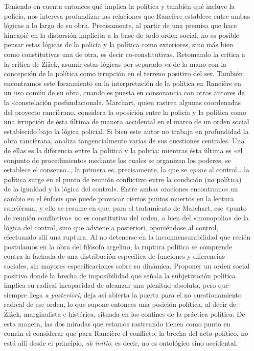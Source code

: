 Teniendo en cuenta entonces qué implica la política y también qué incluye la policía, nos interesa profundizar las relaciones que Rancière establece entre ambas lógicas a lo largo de su obra. Precisamente, al partir de una premisa que hace hincapié en la distorsión implícita a la base de todo orden social, no es posible pensar estas lógicas de la policía y la política como exteriores, sino más bien como constitutivas una de otra, es decir co-constitutivas. Retomando la crítica a la crítica de Žižek, asumir estas lógicas por separado va de la mano con la concepción de la política como irrupción en el terreno positivo del ser. También encontramos este forzamiento en la interpretación de la política en Rancière en un uso común de su obra, cuando es puesta en consonancia con otros autores de la «constelación posfundacional». Marchart, quien rastrea algunas coordenadas del proyecto rancièrano, considera la oposición entre la policía y la política como una irrupción de ésta última de manera accidental en el marco de un orden social establecido bajo la lógica policial. Si bien este autor no trabaja en profundidad la obra rancièrana, analiza tangencialmente varias de sus cuestiones centrales. Una de ellas es la diferencia entre la política y la policía: mientras ésta última es «el conjunto de procedimientos mediante los cuales se organizan los poderes, se establece el consenso\ldots, la primera es, precisamente, la que se \emph{opone} al control\ldots{} la política surge en el punto de reunión conflictivo entre la condición (no política) de la igualdad y la lógica del control». Entre ambas oraciones encontramos un cambio en el énfasis que puede provocar ciertos puntos muertos en la lectura rancièrana, y ello se resume en que, para el tratamiento de Marchart, ese «punto de reunión conflictivo» no es constitutivo del orden, o bien del «monopolio» de la lógica del control, sino que adviene a posteriori, oponiéndose al control, efectuando allí una ruptura. Al no detenerse en la inconmensurabilidad que recién postulamos en la obra del filósofo argelino, la ruptura política se comprende contra la fachada de una distribución específica de funciones y diferencias sociales, sin mayores especificaciones sobre su dinámica. Proponer un orden social positivo donde la brecha de imposibilidad que señala la subjetivación política implica su radical incapacidad de alcanzar una plenitud absoluta, pero que siempre llega \emph{a posteriori}, deja así abierta la puerta para el no cuestionamiento radical de ese orden, lo que supone entonces una posición política, al decir de Žižek, marginalista e histérica, situada en los confines de la práctica política. De esta manera, las dos miradas que estamos rastreando tienen como punto en común el considerar que para Rancière el conflicto, la brecha del acto político, no está allí desde el principio, \emph{ab initio}, es decir, no es ontológico sino accidental.

